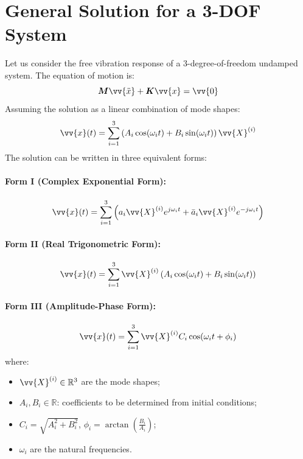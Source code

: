 \section{General Solution for a 3-DOF System}

Let us consider the free vibration response of a 3-degree-of-freedom undamped system. The equation of motion is:
\[
\boldsymbol{M} \vv{\ddot{x}} + \boldsymbol{K} \vv{x} = \vv{0}
\]
Assuming the solution as a linear combination of mode shapes:
\[
\vv{x}(t) = \sum_{i=1}^3 \left( A_i \cos(\omega_i t) + B_i \sin(\omega_i t) \right) \vv{X}^{(i)}
\]
The solution can be written in three equivalent forms:

\paragraph{Form I (Complex Exponential Form):}
\[
\vv{x}(t) = \sum_{i=1}^3 \left( a_i  \vv{X}^{(i)}  e^{j \omega_i t} + \bar{a}_i  \vv{X}^{(i)}  e^{-j \omega_i t} \right)
\]

\paragraph{Form II (Real Trigonometric Form):}
\[
\vv{x}(t) = \sum_{i=1}^3 \vv{X}^{(i)} \left( A_i \cos(\omega_i t) + B_i \sin(\omega_i t) \right)
\]

\paragraph{Form III (Amplitude-Phase Form):}
\[
\vv{x}(t) = \sum_{i=1}^3 \vv{X}^{(i)}  C_i \cos(\omega_i t + \phi_i)
\]
where:
\begin{itemize}
    \item \( \vv{X}^{(i)} \in \mathbb{R}^3 \) are the mode shapes;
    \item \( A_i, B_i \in \mathbb{R} \): coefficients to be determined from initial conditions;
    \item \( C_i = \sqrt{A_i^2 + B_i^2} \), \( \phi_i = \arctan\left( \frac{B_i}{A_i} \right) \);
    \item \( \omega_i \) are the natural frequencies.
\end{itemize}

